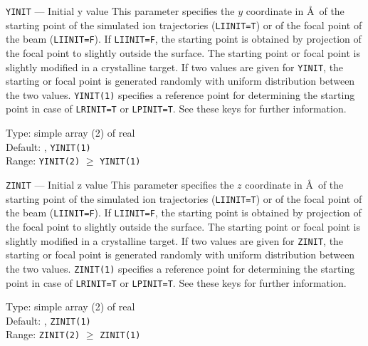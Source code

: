 \begin{keydescription}{\texttt{YINIT} --- Initial y value}
%
  This parameter specifies the $y$ coordinate in \AA\ of the starting point of
  the simulated ion trajectories (\texttt{LIINIT=T}) or of the focal point of the
  beam (\texttt{LIINIT=F}). If \texttt{LIINIT=F}, the starting point is obtained
  by projection of the focal point to slightly outside the surface. The starting
  point or focal point is slightly modified in a crystalline target. If
  two values are given for \texttt{YINIT}, the starting or focal point is
  generated randomly with uniform distribution between the two values.
  \ifprivate 
    \texttt{YINIT(1)} specifies a reference point for determining the
    starting point in case of \texttt{LRINIT=T} or \texttt{LPINIT=T}.
    See these keys for further information.
  \fi
%
  \begin{keytab}
    Type:    \> simple array (2) of real \\
    Default: , \texttt{YINIT(1)} \\
    Range:   \> \texttt{YINIT(2)} $\ge$ \texttt{YINIT(1)}
  \end{keytab}
\end{keydescription}

\begin{keydescription}{\texttt{ZINIT} --- Initial z value}
%
  This parameter specifies the $z$ coordinate in \AA\ of the starting point of
  the simulated ion trajectories (\texttt{LIINIT=T}) or of the focal point of the
  beam (\texttt{LIINIT=F}). If \texttt{LIINIT=F}, the starting point is obtained
  by projection of the focal point to slightly outside the surface. The starting
  point or focal point is slightly modified in a crystalline target. If
  two values are given for \texttt{ZINIT}, the starting or focal point is
  generated randomly with uniform distribution between the two values.
  \ifprivate 
    \texttt{ZINIT(1)} specifies a reference point for determining the
    starting point in case of \texttt{LRINIT=T} or \texttt{LPINIT=T}.
    See these keys for further information.
  \fi
%
  \begin{keytab}
    Type:    \> simple array (2) of real \\
    Default: , \texttt{ZINIT(1)} \\
    Range:   \> \texttt{ZINIT(2)} $\ge$ \texttt{ZINIT(1)}
  \end{keytab}
\end{keydescription}

